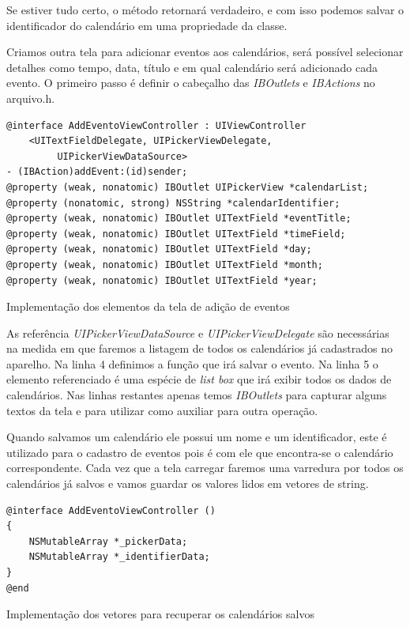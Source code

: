 \documentclass[a4paper,12pt,brazil,doubleside]{book}
\begin{document}
\begin{singlespace}
Se estiver tudo certo, o método retornará verdadeiro, e com isso podemos salvar o identificador do calendário em uma propriedade da classe.

Criamos outra tela para adicionar eventos aos calendários, será possível selecionar detalhes como tempo, data, título e em qual calendário será adicionado cada evento.
O primeiro passo é definir o cabeçalho das \emph{IBOutlets} e \emph{IBActions} no arquivo.h.

\begin{listing}[H]
\begin{verbatim}
@interface AddEventoViewController : UIViewController 
	<UITextFieldDelegate, UIPickerViewDelegate,
		 UIPickerViewDataSource>
- (IBAction)addEvent:(id)sender;
@property (weak, nonatomic) IBOutlet UIPickerView *calendarList;
@property (nonatomic, strong) NSString *calendarIdentifier;
@property (weak, nonatomic) IBOutlet UITextField *eventTitle;
@property (weak, nonatomic) IBOutlet UITextField *timeField;
@property (weak, nonatomic) IBOutlet UITextField *day;
@property (weak, nonatomic) IBOutlet UITextField *month;
@property (weak, nonatomic) IBOutlet UITextField *year;
\end{verbatim}
\caption{Implementação dos elementos da tela de adição de eventos}
\end{listing}

As referência \emph{UIPickerViewDataSource} e \emph{UIPickerViewDelegate} são necessárias na medida em que faremos a listagem de todos os calendários já cadastrados no aparelho. Na linha 4 definimos a função que irá salvar o evento. Na linha 5 o elemento referenciado é uma espécie de \emph{list box} que irá exibir todos os dados de calendários.
Nas linhas restantes apenas temos \emph{IBOutlets} para capturar alguns textos da tela e para utilizar como  auxiliar para outra operação.

Quando salvamos um calendário ele possui um nome e um identificador, este é utilizado para o cadastro de eventos pois é com ele que encontra-se o calendário correspondente. Cada vez que a tela carregar faremos uma varredura por todos os calendários já salvos e vamos guardar os valores lidos em vetores de string.

\begin{listing}[H]
\begin{verbatim}
@interface AddEventoViewController ()
{
    NSMutableArray *_pickerData;
    NSMutableArray *_identifierData;
}
@end
\end{verbatim}
\caption{Implementação dos vetores para recuperar os calendários salvos}
\end{listing}


\end{singlespace}
\end{document}
